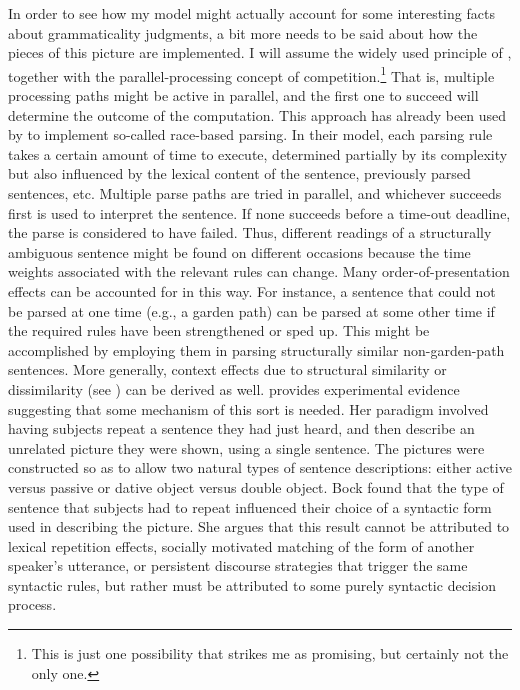  In order to see how my model might actually account for some interesting facts about grammaticality judgments, a bit more needs to be said about how the pieces of this picture are implemented. I will assume the widely used principle of , together with the parallel-processing concept of competition.\footnote{This is just one possibility that strikes me as promising, but certainly not the only  one.}
 That is, multiple processing paths might be active in parallel, and the first one to succeed will determine the outcome of the computation. This approach has already been used by \citet{McRoyEtAl1990} to implement so-called race-based parsing. In their model, each parsing rule takes a certain amount of time to execute, determined partially by its complexity but also influenced by the lexical content of the sentence, previously parsed sentences, etc. Multiple parse paths are tried in parallel, and whichever succeeds first is used to interpret the sentence. If none succeeds before a time-out deadline, the parse is considered to have failed. Thus, different readings of a structurally ambiguous sentence might be found on different occasions because the time weights associated with the relevant rules can change. Many order-of-presentation effects can be accounted for in this way. For instance, a sentence that could not be parsed at one time (e.g., a garden path) can be parsed at some other time if the required rules have been strengthened or sped up. This might be accomplished by employing them in parsing structurally similar non-garden-path sentences. More generally, context effects due to structural similarity or dissimilarity (see ) can be derived as well. \citet{Bock1986} provides experimental evidence suggesting that some mechanism of this sort is needed. Her paradigm involved having subjects repeat a sentence they had just heard, and then describe an unrelated picture they were shown, using a single sentence. The pictures were constructed so as to allow two natural types of sentence descriptions: either active versus passive or dative object versus double object. Bock found that the type of sentence that subjects had to repeat influenced their choice of a syntactic form used in describing the picture. She argues that this result cannot be attributed to lexical repetition effects, socially motivated matching of the form of another speaker's utterance, or persistent discourse strategies that trigger the same syntactic rules, but rather must be attributed to some purely syntactic decision process.

